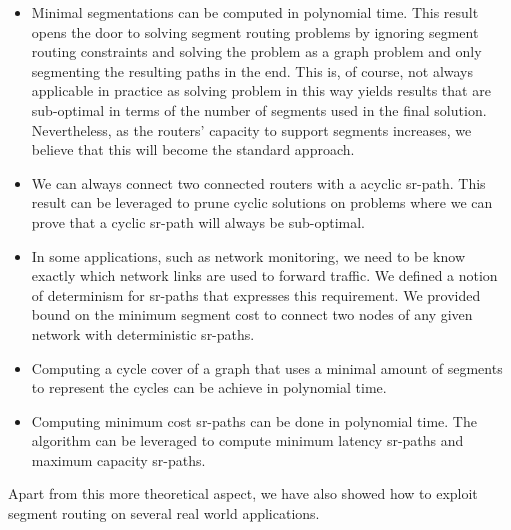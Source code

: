 \documentclass[a4paper,10pt]{book}
\begin{document}
\begin{itemize}

 \item Minimal segmentations can be computed in polynomial time. This result opens the door to solving segment routing problems
 by ignoring segment routing constraints and solving the problem as a graph problem and only segmenting the resulting paths
 in the end. This is, of course, not always applicable in practice as solving problem in this way yields results that are
 sub-optimal in terms of the number of segments used in the final solution. Nevertheless, as the routers' capacity to support segments
 increases, we believe that this will become the standard approach.
 
 \item We can always connect two connected routers with a acyclic sr-path. This result can be leveraged to prune cyclic solutions on
 problems where we can prove that a cyclic sr-path will always be sub-optimal.
 
 \item In some applications, such as network monitoring, we need to be know exactly which network links are used to forward traffic. We
 defined a notion of determinism for sr-paths that expresses this requirement. We provided bound on the minimum segment cost to connect
 two nodes of any given network with deterministic sr-paths.
 
 \item Computing a cycle cover of a graph that uses a minimal amount of segments to 
 represent the cycles can be achieve in polynomial time.
 
 \item Computing minimum cost sr-paths can be done in polynomial time. The algorithm can be leveraged to compute
 minimum latency sr-paths and maximum capacity sr-paths.
 
\end{itemize}

Apart from this more theoretical aspect, we have also showed how to exploit segment routing on several real world applications.
\end{document}
